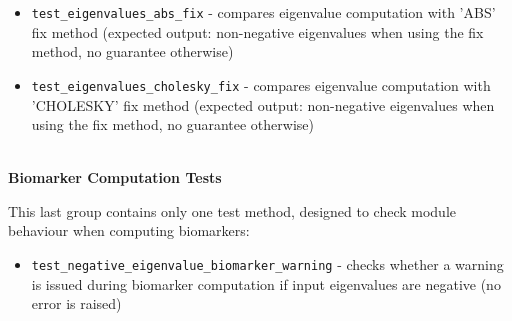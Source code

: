 \begin{itemize}
	\item 
	\texttt{test\_eigenvalues\_abs\_fix} - compares eigenvalue computation with 'ABS' fix method (expected output: non-negative eigenvalues when using the fix method, no guarantee otherwise)
	
	\item
	\texttt{test\_eigenvalues\_cholesky\_fix} - compares eigenvalue computation with 'CHOLESKY' fix method (expected output: non-negative eigenvalues when using the fix method, no guarantee otherwise)
\end{itemize}

\hfill\\
\textbf{Biomarker Computation Tests}
\hfill

This last group contains only one test method, designed to check module behaviour when computing biomarkers:

\begin{itemize}
	\item 
	\texttt{test\_negative\_eigenvalue\_biomarker\_warning} - checks whether a warning is issued during biomarker computation if input eigenvalues are negative (no error is raised)
\end{itemize}